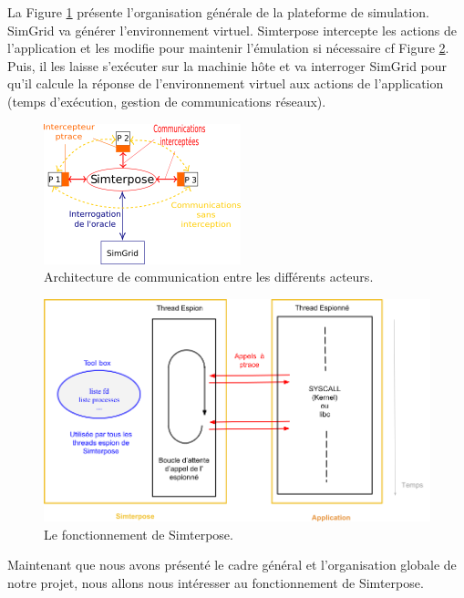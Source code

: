 La Figure \ref{Organisation_generale} présente l'organisation générale de la plateforme de simulation. SimGrid va générer l'environnement virtuel. Simterpose intercepte les
actions de l'application et les modifie pour maintenir l'émulation si
nécessaire cf Figure \ref{Organisation_Simterpose}. Puis, il les laisse
s'exécuter sur la machinie hôte et va interroger SimGrid pour qu'il calcule la
réponse de l'environnement virtuel aux actions de l'application (temps d'exécution, gestion de communications réseaux).

\begin{figure}[H]
  \centering
  \includegraphics{Pictures/png/Communications_Simterpose_interprocess_v2}
  \caption{Architecture de communication entre les différents acteurs.}
  \label{Organisation_generale}
\end{figure}

\begin{figure}[H]
  \centering
  \includegraphics[scale=0.5]{Pictures/png/Simterpose_orga_code_v3}
  \caption{Le fonctionnement de Simterpose.}
  \label{Organisation_Simterpose}
\end{figure}

Maintenant que nous avons présenté le cadre général et l'organisation globale
de notre projet, nous allons nous intéresser au fonctionnement de Simterpose.
